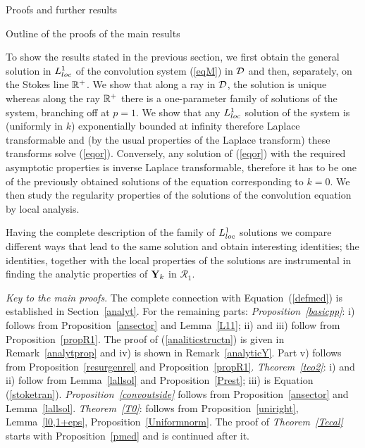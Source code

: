 \documentclass[12pt]{article}
\begin{document}
\begin{section}{Proofs and further results}
\begin{subsection}{Outline of the proofs of the main results}

To show the results stated in the previous section, 
we first obtain the general solution in ${L}^1_{loc}$ of the 
convolution system  (\ref{eqM}) in ${\cal D}$ and then, separately, 
on the Stokes line $\mathbb{R}^+$. We show that 
along a  ray in ${\cal D}$, the solution is unique whereas along
the ray $\mathbb{R}^+$ there is a one-parameter family of solutions
of the system, branching off at $p=1$.  
We show that any ${L}^1_{loc}$ solution of the system
is (uniformly in $k$) exponentially bounded
at infinity therefore Laplace transformable and  (by the usual properties
of the Laplace transform) these transforms solve (\ref{eqor}).
Conversely, any solution of (\ref{eqor}) with the required
asymptotic properties is inverse Laplace transformable, therefore
it has to be one of the previously obtained solutions of the  equation corresponding
to $k=0$.
We then  study the regularity properties of the solutions of the convolution
equation by local analysis.

Having the complete description
of the family of ${L}^1_{loc}$ solutions we compare
different ways that lead to the same solution and
obtain interesting identities; the identities, together 
with the local properties of the solutions are
instrumental in finding the analytic properties of ${\bf Y}_k$
in $\mathcal{R}_1$.

\emph{Key to the main proofs}. The complete connection with
Equation~(\ref{defmed}) is established in Section~\ref{analyt}.
For the remaining parts: {\emph{Proposition~\ref{basicpp}}}: i)
follows from Proposition~\ref{ansector} and Lemma~\ref{L11};
ii) and  iii) follow from Proposition~\ref{propR1}. The proof
of (\ref{analiticstructn}) is given in Remark~\ref{analytprop}
and iv) is shown in Remark~\ref{analyticY}.
Part v) follows from  
Proposition~\ref{resurgenrel} and Proposition~\ref{propR1}. {\emph{Theorem~\ref{teo2}}}:
i) and ii) follow from Lemma~\ref{lallsol} and  Proposition~\ref{Prest}; iii) is
Equation (\ref{stoketran}). {\emph{Proposition~\ref{convoutside}
}} follows from Proposition~\ref{ansector} and Lemma~\ref{lallsol}.
{\emph{Theorem~\ref{T0}}}: follows from
Proposition~\ref{uniright}, Lemma~\ref{l0,1+eps},
 Proposition~\ref{Uniformnorm}. The proof of
\emph{Theorem~\ref{Tecal}} starts with Proposition~\ref{pmed}
and is continued after it. 


\end{subsection}


\end{section}
\end{document}
